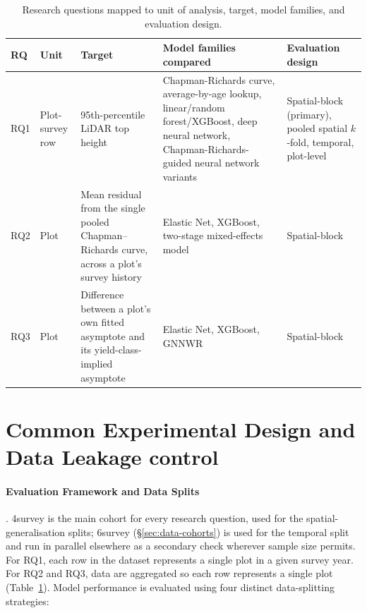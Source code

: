 \documentclass[11pt,a4paper]{report}
\begin{document}
\begin{table}[!htbp]
\scriptsize
\renewcommand{\arraystretch}{1.2}
\begin{tabular}{p{0.8cm}p{1.4cm}p{3.3cm}p{4.2cm}p{2.9cm}}
\toprule
RQ & Unit & Target & Model families compared & Evaluation design \\
\midrule
RQ1 & Plot-survey row & 95th-percentile LiDAR top height & Chapman-Richards curve, average-by-age
lookup, linear/random forest/XGBoost, deep neural network, Chapman-Richards-guided neural network
variants & Spatial-block (primary), pooled spatial $k$-fold, temporal, plot-level \\
RQ2 & Plot & Mean residual from the single pooled Chapman--Richards curve, across a plot's survey
history & Elastic Net, XGBoost, two-stage mixed-effects model & Spatial-block \\
RQ3 & Plot & Difference between a plot's own fitted asymptote and its yield-class-implied
asymptote & Elastic Net, XGBoost, GNNWR & Spatial-block \\
\bottomrule
\end{tabular}
\caption{Research questions mapped to unit of analysis, target, model families, and evaluation
design.}
\label{tab:rq-framework}
\end{table}

\section{Common Experimental Design and Data Leakage control}

\paragraph*{Evaluation Framework and Data Splits}. 4survey is the main cohort for every research question, used for the spatial-generalisation splits; 6survey (\S\ref{sec:data-cohorts}) is used for the temporal split and run in parallel elsewhere as a secondary check wherever sample size permits. For RQ1, each row in the dataset represents a single plot in a given survey year. For RQ2 and RQ3, data are aggregated so each row represents a single plot (Table~\ref{tab:rq-framework}). Model performance is evaluated using four distinct data-splitting strategies:
\end{document}
